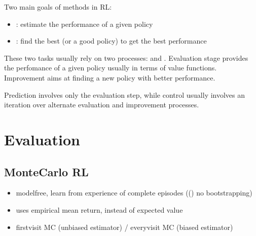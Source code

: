 \documentclass[letterpaper,10pt,english]{jupyterBook}
\begin{document}
\sphinxAtStartPar
Two main goals of methods in RL:
\begin{itemize}
\item {} 
\sphinxAtStartPar
{\hyperref[\detokenize{ch/rl/mdp_sol_rl:rl-mdp-sol-rl-eval}]{}}: estimate the performance of a given policy

\item {} 
\sphinxAtStartPar
{\hyperref[\detokenize{ch/rl/mdp_sol_rl:rl-mdp-sol-rl-control}]{}}: find the best (or a good policy) to get the best performance

\end{itemize}

\sphinxAtStartPar
These two tasks usually rely on two processes: {\hyperref[\detokenize{ch/rl/mdp_sol_rl:rl-mdp-sol-rl-eval}]{}} and {\hyperref[\detokenize{ch/rl/mdp_sol_rl:rl-mdp-sol-rl-control-improv}]{}}. Evaluation stage provides the perfomance of a given policy usually in terms of value functions. Improvement aims at finding a new policy with better performance.

\sphinxAtStartPar
Prediction involves only the evaluation step, while control usually involves an iteration over alternate evaluation and improvement processes.


\section{Evaluation}
\label{\detokenize{ch/rl/mdp_sol_rl:evaluation}}\label{\detokenize{ch/rl/mdp_sol_rl:rl-mdp-sol-rl-eval}}

\subsection{Monte\sphinxhyphen{}Carlo RL}
\label{\detokenize{ch/rl/mdp_sol_rl:monte-carlo-rl}}\label{\detokenize{ch/rl/mdp_sol_rl:rl-mdp-sol-rl-eval-mc}}\begin{itemize}
\item {} 
\sphinxAtStartPar
model\sphinxhyphen{}free, learn from experience of complete episodes ((\sphinxhyphen{}) no bootstrapping)

\item {} 
\sphinxAtStartPar
uses empirical mean return, instead of expected value

\item {} 
\sphinxAtStartPar
first\sphinxhyphen{}visit MC (unbiased estimator) / every\sphinxhyphen{}visit MC (biased estimator)

\end{itemize}
\end{document}

